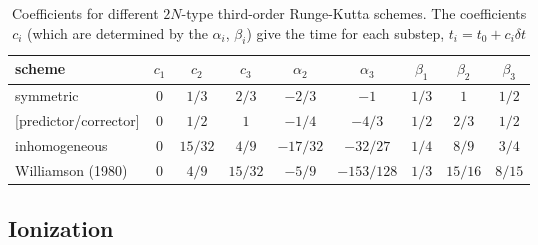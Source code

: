 \documentclass[\mydriver,12pt,twoside,notitlepage,a4paper]{article}
\begin{document}
\begin{table}[htb]
  \centering
  \caption{
    Coefficients for different $2N$-type third-order Runge-Kutta
    schemes.
    The coefficients $c_i$ (which are determined by the $\alpha_i$,
    $\beta_i$) give the time for each substep,
    $t_i = t_0 + c_i \delta t$
    }\label{T-2N-RK3}
  \vspace{12pt}
  \begin{tabular}{l@{\quad}ccc@{\quad}cc@{\quad}ccc}
    \toprule
    scheme            & $c_1$
                            & $c_2$
                                    & $c_3$
                                              & $\alpha_2$
                                                         & $\alpha_3$
                                                                    & $\beta_1$
                                                                            &$\beta_2$
                                                                                    & $\beta_3$\\
    \midrule
    symmetric         & $0$ & $1/3$ & $2/3$   &  $-2/3$  &   $-1$   & $1/3$ &  $1$  & $1/2$ \\
    {}[predictor/corrector]
                      & $0$ & $1/2$ & $1$     &  $-1/4$  &  $-4/3$  & $1/2$ & $2/3$ & $1/2$ \\
    inhomogeneous     & $0$ & $15/32$ & $4/9$ & $-17/32$ & $-32/27$ & $1/4$ & $8/9$ & $3/4$ \\
    Williamson (1980) & $0$ & $4/9$ & $15/32$ &  $-5/9$  &$-153/128$& $1/3$ &$15/16$& $8/15$\\
    \bottomrule
  \end{tabular}
\end{table}

\subsection{Ionization}
\label{S-Ioni}
\end{document}
